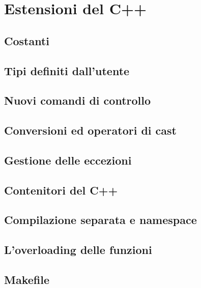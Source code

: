 \chapter{Estensioni del C++}

\section{Costanti}

\section{Tipi definiti dall'utente}

\section{Nuovi comandi di controllo}

\section{Conversioni ed operatori di cast}

\section{Gestione delle eccezioni}

\section{Contenitori del C++}

\section{Compilazione separata e namespace}

\section{L'overloading delle funzioni}

\section{Makefile}